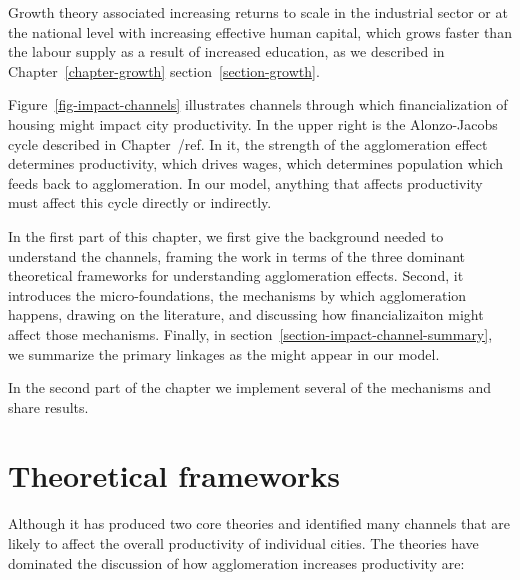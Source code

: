 Growth theory associated increasing returns to scale in the industrial sector or at the national level with increasing effective human capital, which grows faster than the labour supply as a result of increased education, as we described in Chapter~\ref{chapter-growth} section~\ref{section-growth}. %

Figure~\ref{fig-impact-channels} illustrates channels through which financialization of housing might impact city productivity. In the upper right is the \gls{Alonzo-Jacobs cycle} described in Chapter~/ref{}. In it, the strength of the agglomeration effect determines productivity, which drives wages, which determines population which feeds back to agglomeration. In our model, anything that affects productivity must affect this cycle directly or indirectly. 


In the first part of this chapter, we first give the background needed to understand the channels, framing the work in terms of the three dominant theoretical frameworks for understanding agglomeration effects. Second, it introduces the micro-foundations, the mechanisms by which agglomeration happens, drawing on the literature, and discussing how financializaiton might affect those mechanisms. Finally, in section~\ref{section-impact-channel-summary}, we summarize the primary linkages as the might appear in our model. 


In the second part of the chapter we implement several of the mechanisms and share results. 





\section{Theoretical frameworks} %
Although  it has produced two core theories and identified many channels that are likely to affect the overall productivity of individual cities. The  theories have dominated the discussion of how agglomeration increases productivity are:

